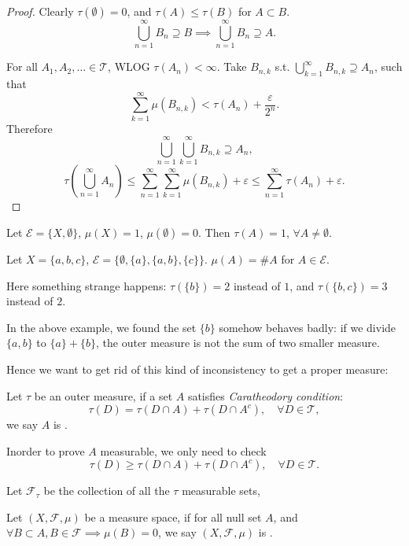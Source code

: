 \begin{proof}[Proof]
    Clearly $\tau(\emptyset) = 0$, and  $\tau(A)\le \tau(B)$ for $A \subset B$.
	\[
	\bigcup_{n=1}^\infty B_n \supseteq B \implies \bigcup_{n=1}^\infty B_n \supseteq A.
	\]

	For all $A_1,A_2,\dots\in \mathscr{T}$, WLOG $\tau(A_n)<\infty$.
	Take $B_{n,k}$ s.t. $\bigcup_{k=1}^\infty B_{n,k}\supseteq A_n$, such that
	\[
	\sum_{k=1}^{\infty}\mu(B_{n,k}) < \tau(A_n) + \frac{\varepsilon}{2^n}.
	\]
	Therefore
	\[
	\bigcup_{n=1}^\infty\bigcup_{k=1}^\infty B_{n,k}\supseteq A_n,
	\]
	\[
	\tau\left(\bigcup_{n=1}^\infty A_n\right)
	\le \sum_{n=1}^{\infty}\sum_{k=1}^{\infty}\mu(B_{n,k}) + \varepsilon
	\le \sum_{n=1}^{\infty} \tau(A_n) + \varepsilon.
	\]
\end{proof}

\begin{example}
    Let $\mathscr{E}=\{X,\emptyset\}$, $\mu(X)=1$, $\mu(\emptyset)=0$.
	Then  $\tau(A)=1$, $\forall A\ne \emptyset$.
\end{example}
\begin{example}
    Let $X=\{a,b,c\}$, $\mathscr{E}=\{\emptyset,\{a\},\{a,b\},\{c\}\}$.
	$\mu(A) = \#A$ for $A\in \mathscr{E}$.

	Here something strange happens:
	$\tau(\{b\}) = 2$ instead of $1$, and  $\tau(\{b,c\}) = 3$ instead of $2$.
\end{example}

In the above example,
we found the set $\{b\}$ somehow behaves badly:
if we divide $\{a,b\}$ to $\{a\}+\{b\}$, the outer measure is not the sum
of two smaller measure.

Hence we want to get rid of this kind of inconsistency to get
a proper measure:
\begin{definition}
	Let $\tau$ be an outer measure, if a set  $A$ satisfies
	\textit{Caratheodory condition}:
	\[
	\tau(D) = \tau(D\cap A) + \tau(D\cap A^c), \quad \forall D\in \mathscr{T},
	\]
	we say $A$ is .
\end{definition}
\begin{remark}
    Inorder to prove $A$ measurable, we only need to check
	\[
	\tau(D)\ge \tau(D\cap A)+\tau(D\cap A^c), \quad \forall D\in \mathscr{T}.
	\]
\end{remark}

Let $\mathscr{F}_\tau$ be the collection of all the $\tau$ measurable sets,

\begin{definition}
	Let $(X,\mathscr{F},\mu)$ be a measure space, if for all null set $A$,
	and $\forall B \subset A, B\in \mathscr{F} \implies \mu(B)=0$,
	we say $(X,\mathscr{F},\mu)$ is .
\end{definition}

